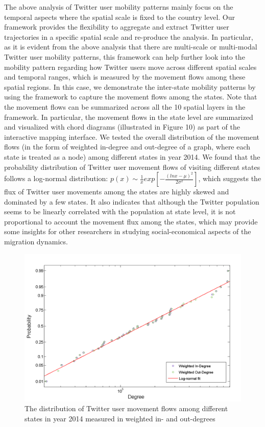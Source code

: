 \documentclass[ijgi,article,submit,moreauthors,pdftex,10pt,a4paper]{mdpi}
\theoremstyle{mdpi}
\newcounter{ex}
\newcounter{re}
\theoremstyle{mdpidefinition}
\begin{document}
The above analysis of Twitter user mobility patterns mainly focus on the temporal aspects where the spatial scale is fixed to the country level.
Our framework provides the flexibility to aggregate and extract Twitter user trajectories in a specific spatial scale and re-produce the analysis. 
In particular, as it is evident from the above analysis that there are multi-scale or multi-modal Twitter user mobility patterns, this framework can help further look into the mobility pattern regarding how Twitter users move across different spatial scales and temporal ranges, which is measured by the movement flows among these spatial regions.  In this case, we demonstrate the inter-state mobility patterns by using the framework to capture the movement flows among the states. Note that the movement flows can be summarized across all the 10 spatial layers in the framework. 
In particular, the movement flows in the state level are summarized and visualized with chord diagrams (illustrated in Figure 10) as part of the interactive mapping interface.
We tested the overall distribution of the movement flows (in the form of weighted in-degree and out-degree of a graph, where each state is treated as a node) among different states in year 2014.  
We found that the probability distribution of Twitter user movement flows of visiting different states follows a log-normal distribution: $p(x)\sim \frac{1}{x}exp[-\frac{(lnx - \mu)^{2}}{2\sigma^{2}}]$, which suggests the flux of Twitter user movements among the states are highly skewed and dominated by a few states. It also indicates that although the Twitter population seems to be linearly correlated with the population at state level, it is not proportional to account the movement flux among the states, which may provide some insights for other researchers in studying social-economical aspects of the migration dynamics.

\begin{figure}[ht]
\centering
\includegraphics[width=0.8\linewidth]{./figures/degree}
\caption{The distribution of Twitter user movement flows among different states in year 2014 measured in weighted in- and out-degrees}
\label{fig:Arch}
\end{figure}
\FloatBarrier
\end{document}
